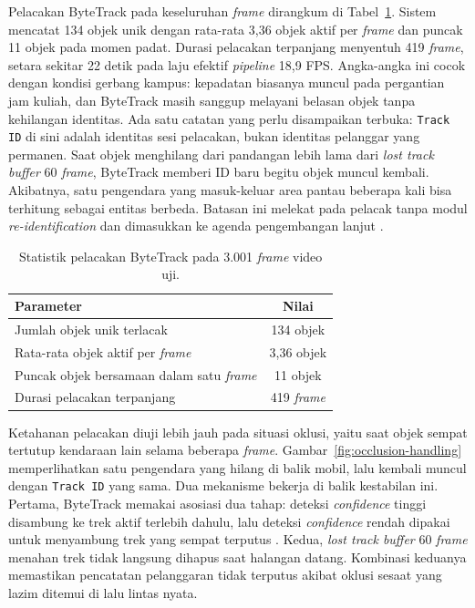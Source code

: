 Pelacakan ByteTrack pada keseluruhan \textit{frame} dirangkum di Tabel~\ref{tab:bytetrack-basic-stats}. Sistem mencatat 134 objek unik dengan rata-rata 3,36 objek aktif per \textit{frame} dan puncak 11 objek pada momen padat. Durasi pelacakan terpanjang menyentuh 419 \textit{frame}, setara sekitar 22 detik pada laju efektif \textit{pipeline} 18,9 FPS. Angka-angka ini cocok dengan kondisi gerbang kampus: kepadatan biasanya muncul pada pergantian jam kuliah, dan ByteTrack masih sanggup melayani belasan objek tanpa kehilangan identitas. Ada satu catatan yang perlu disampaikan terbuka: \texttt{Track ID} di sini adalah identitas sesi pelacakan, bukan identitas pelanggar yang permanen. Saat objek menghilang dari pandangan lebih lama dari \textit{lost track buffer} 60 \textit{frame}, ByteTrack memberi ID baru begitu objek muncul kembali. Akibatnya, satu pengendara yang masuk-keluar area pantau beberapa kali bisa terhitung sebagai entitas berbeda. Batasan ini melekat pada pelacak tanpa modul \textit{re-identification} dan dimasukkan ke agenda pengembangan lanjut \cite{zhang2022bytetrack_eccv}.

\begin{table}[htbp]
\centering
\caption{Statistik pelacakan ByteTrack pada 3.001 \textit{frame} video uji.}
\label{tab:bytetrack-basic-stats}
\begin{tabular}{lc}
\toprule
\textbf{Parameter} & \textbf{Nilai} \\
\midrule
Jumlah objek unik terlacak & 134 objek \\
Rata-rata objek aktif per \textit{frame} & 3,36 objek \\
Puncak objek bersamaan dalam satu \textit{frame} & 11 objek \\
Durasi pelacakan terpanjang & 419 \textit{frame} \\
\bottomrule
\end{tabular}
\end{table}

Ketahanan pelacakan diuji lebih jauh pada situasi oklusi, yaitu saat objek sempat tertutup kendaraan lain selama beberapa \textit{frame}. Gambar~\ref{fig:occlusion-handling} memperlihatkan satu pengendara yang hilang di balik mobil, lalu kembali muncul dengan \texttt{Track ID} yang sama. Dua mekanisme bekerja di balik kestabilan ini. Pertama, ByteTrack memakai asosiasi dua tahap: deteksi \textit{confidence} tinggi disambung ke trek aktif terlebih dahulu, lalu deteksi \textit{confidence} rendah dipakai untuk menyambung trek yang sempat terputus \cite{ma2023adaptivebytetrack}. Kedua, \textit{lost track buffer} 60 \textit{frame} menahan trek tidak langsung dihapus saat halangan datang. Kombinasi keduanya memastikan pencatatan pelanggaran tidak terputus akibat oklusi sesaat yang lazim ditemui di lalu lintas nyata.

